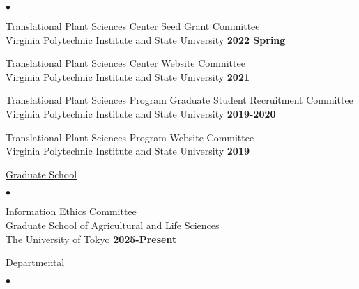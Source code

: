 \documentclass[margin,line,10pt]{res}
\newenvironment{list2}{
  \begin{list}{$\bullet$}{%
      \setlength{\itemsep}{0in}
      \setlength{\parsep}{0in} \setlength{\parskip}{0in}
      \setlength{\topsep}{0in} \setlength{\partopsep}{0in} 
      \setlength{\leftmargin}{0.2in}}}{\end{list}}
\begin{document}
\begin{resume}
\begin{list2}
  \vspace{0.3cm}
  
  \item Translational Plant Sciences Center Seed Grant Committee \\
  Virginia Polytechnic Institute and State University  \hfill \textbf{2022 Spring}\\

  \vspace{0.3cm}

\item Translational Plant Sciences Center Website Committee \\
  Virginia Polytechnic Institute and State University  \hfill \textbf{2021}\\

  \vspace{0.3cm}


  \item Translational Plant Sciences Program Graduate Student Recruitment Committee \\
  Virginia Polytechnic Institute and State University  \hfill \textbf{2019-2020}\\

  \vspace{0.3cm}
  
\item Translational Plant Sciences Program Website Committee \\
  Virginia Polytechnic Institute and State University  \hfill \textbf{2019}\\

  
\end{list2}

  
\begin{flushleft}
  \hspace{0.3cm} \underline{Graduate School}
\end{flushleft}
\begin{list2}

  \item  Information Ethics Committee   \\ %
  Graduate School of Agricultural and Life Sciences  \\ The University of Tokyo   \hfill \textbf{2025-Present}\\


\end{list2}
  

\begin{flushleft}
  \hspace{0.3cm} \underline{Departmental}
\end{flushleft}
\begin{list2}


\end{list2}
\end{resume}
\end{document}
